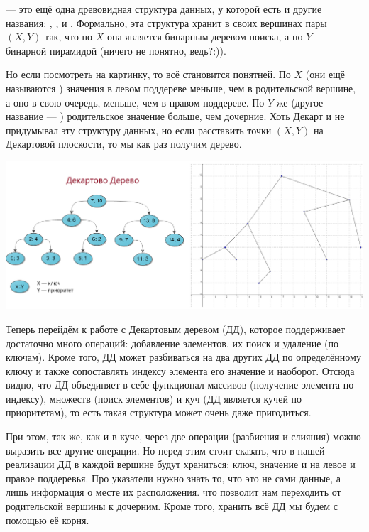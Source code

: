  — это ещё одна древовидная структура данных, у которой есть и другие названия: , ,  и . Формально, эта структура хранит в своих вершинах пары $(X, Y)$ так, что по $X$ она является бинарным деревом поиска, а по $Y$ — бинарной пирамидой (ничего не понятно, ведь?:)).

Но если посмотреть на картинку, то всё становится понятней. По $X$ (они ещё называются ) значения в левом поддереве меньше, чем в родительской вершине, а оно в свою очередь, меньше, чем в правом поддереве. По $Y$ же (другое название — ) родительское значение больше, чем дочерние. Хоть Декарт и не придумывал эту структуру данных, но если расставить точки $(X, Y)$ на Декартовой плоскости, то мы как раз получим дерево.

\includegraphics[scale=0.45]{img/treap.png}

Теперь перейдём к работе с Декартовым деревом (ДД), которое поддерживает достаточно много операций: добавление элементов, их поиск и удаление (по ключам). Кроме того, ДД может разбиваться на два других ДД по определённому ключу и также сопоставлять индексу элемента его значение и наоборот. Отсюда видно, что ДД объединяет в себе функционал массивов (получение элемента по индексу), множеств (поиск элементов) и куч (ДД является кучей по приоритетам), то есть такая структура может очень даже пригодиться.

При этом, так же, как и в куче, через две операции (разбиения и слияния) можно выразить все другие операции. Но перед этим стоит сказать, что в нашей реализации ДД в каждой вершине будут храниться: ключ, значение и  на левое и правое поддеревья. Про указатели нужно знать то, что это не сами данные, а лишь информация о месте их расположения. что позволит нам переходить от родительской вершины к дочерним. Кроме того, хранить всё ДД мы будем с помощью её корня.

